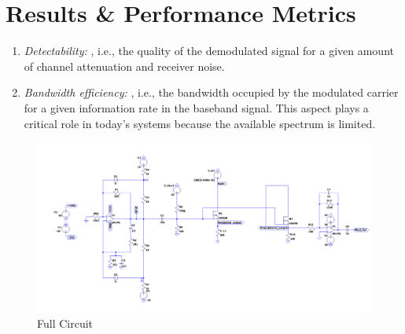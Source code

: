 \documentclass[conference]{IEEEtran}
\begin{document}
\section{Results \& Performance Metrics}


\begin{enumerate}
    \item \textit{Detectability: }, i.e., the quality of the demodulated signal for a given amount of channel attenuation and receiver noise.
    \item \textit{Bandwidth efficiency: }, i.e., the bandwidth occupied by the modulated carrier for a given information rate in the baseband signal. This aspect plays a critical role in today's systems because the available spectrum is limited.  
\end{enumerate}


\begin{figure}
    \centering
    \includegraphics[width=1\linewidth]{Images/Full_circuit_ltspice.png}
    \caption{Full Circuit}
\end{figure}
\end{document}
